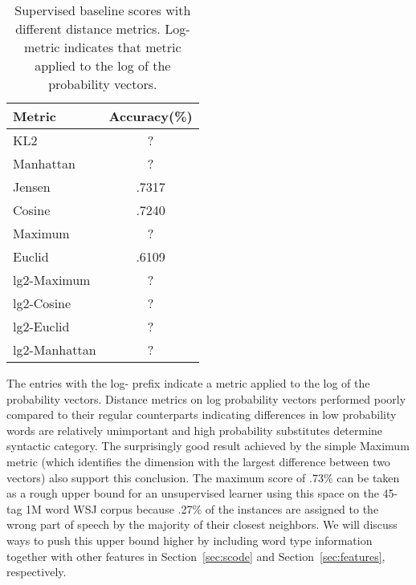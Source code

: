 \begin{table}[ht] \centering
\begin{tabular}{|l|c|}
\hline
Metric & Accuracy(\%) \\
\hline
KL2 & ? \\
Manhattan & ? \\
Jensen & .7317 \\ %
Cosine & .7240 \\ %
Maximum & ? \\
Euclid & .6109 \\ %
lg2-Maximum & ? \\
lg2-Cosine & ? \\
lg2-Euclid & ? \\
lg2-Manhattan & ? \\
\hline
\end{tabular}
\caption{Supervised baseline scores with different distance metrics.
  Log-metric indicates that metric applied to the log of the
  probability vectors.}
\label{tab:distscores}
\end{table}




The entries with the log- prefix indicate a metric applied to the log
of the probability vectors.  Distance metrics on log probability
vectors performed poorly compared to their regular counterparts
indicating differences in low probability words are relatively
unimportant and high probability substitutes determine syntactic
category.  The surprisingly good result achieved by the simple Maximum
metric (which identifies the dimension with the largest difference
between two vectors) also support this conclusion.  The maximum score
of .73\% can be taken as a rough upper bound for an unsupervised
learner using this space on the 45-tag 1M word WSJ corpus because
.27\% of the instances are assigned to the wrong part of speech by the
majority of their closest neighbors.  We will discuss ways to push
this upper bound higher by including word type information together
with other features in Section~\ref{sec:scode} and
Section~\ref{sec:features}, respectively.

